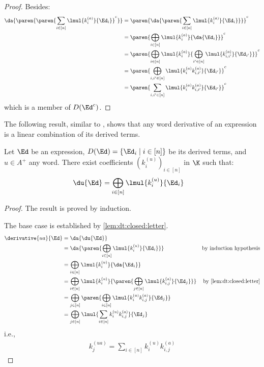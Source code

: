 \documentclass[a4paper,USenglish]{lipics}
\begin{document}
\begin{proof}
  Besides:
  \begin{align*}
    \da{\paren{\paren{\sum_{i\in[n]} \lmul{k_i^{(a)}}{\Ed_i}}^c}}
    &= \paren{\da{\paren{\sum_{i\in[n]} \lmul{k_i^{(a)}}{\Ed_i}}}}^c \\
    &= \paren{\bigoplus_{i\in[n]} \lmul{k_i^{(a)}}{\da{\Ed_i}}}^c\\
    &= \paren{\bigoplus_{i\in[n]} \lmul{k_i^{(a)}}{\bigoplus_{i'\in[n]} \lmul{k_{i,i'}^{(a)}}{\Ed_{i'}}}}^c\\
    &= \paren{\bigoplus_{i,i'\in[n]} \lmul{k_i^{(a)}k_{i,i'}^{(a)}}{\Ed_{i'}}}^c\\
    &= \paren{\sum_{i,i'\in[n]} \lmul{k_i^{(a)}k_{i,i'}^{(a)}}{\Ed_{i'}}}^c
  \end{align*}
  which is a member of $D(\Ed^c)$.
\end{proof}

The following result, similar to \citep[Theorem~3]{lombardy.2005.tcs}, shows
that any word derivative of an expression is a linear combination of its
derived terms.
\begin{theorem}
  \label{thm:k}
  Let $\Ed$ be an expression, $D(\Ed) = \{\Ed_i \mid i \in [n]\}$ be its
  derived terms, and $u \in A^+$ any word.  There exist coefficients
  $(k_i^{(u)})_{i\in[n]}$ in $\K$ such that:
  \begin{align*}
    \du{\Ed}   &= \bigoplus_{i\in[n]} \lmul{k_i^{(u)}}{\Ed_i}
  \end{align*}
\end{theorem}

\begin{proof}
  The result is proved by induction.

  The base case is established by \cref{lem:dt:closed:letter}.
  \begin{align*}
    \derivative{ua}{\Ed}
    &= \da{\du{\Ed}} \\
    &= \da{\paren{\bigoplus_{i\in[n]} \lmul{k_i^{(u)}}{\Ed_i}}}
    & \text{by induction hypothesis}\\
    &= \bigoplus_{i\in[n]} \lmul{k_i^{(u)}}{\da{\Ed_i}} \\
    &= \bigoplus_{i\in[n]} \lmul{k_i^{(u)}}{\paren{\bigoplus_{j\in[n]} \lmul{k_{i,j}^{(a)}}{\Ed_{j}}}}
    & \text{by \cref{lem:dt:closed:letter}} \\
    &= \bigoplus_{j\in[n]} \paren{\bigoplus_{i\in[n]} \lmul{k_i^{(u)}k_{i,j}^{(a)}}{\Ed_{j}}}\\
    &= \bigoplus_{j\in[n]} \lmul{\sum_{i\in[n]} k_i^{(u)}k_{i,j}^{(a)}}{\Ed_{j}}
  \end{align*}
  \noindent
  i.e.,
  \begin{align}
    \label{eq:word:ki}
    k_{j}^{(ua)} = \sum_{i\in[n]} k_i^{(u)}k_{i,j}^{(a)}
  \end{align}
\end{proof}
\end{document}
